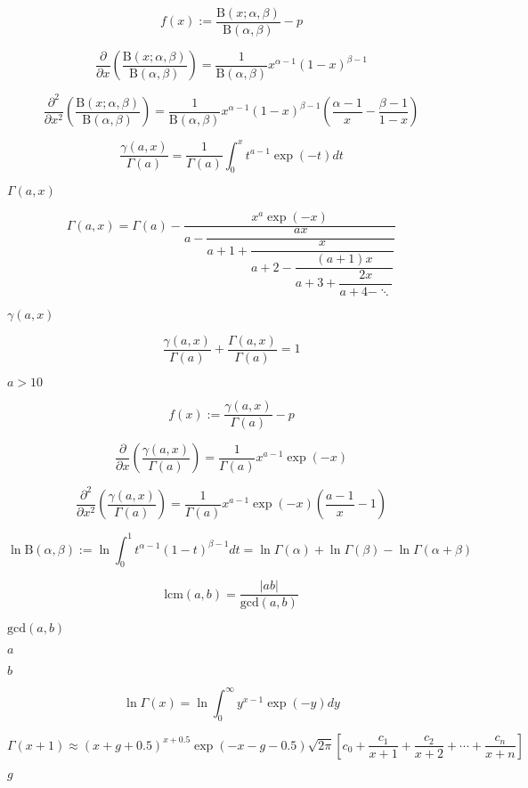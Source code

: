 \documentclass{article}
\begin{document}
\[ f(x) := \frac{\text{B}(x;\alpha,\beta)}{\text{B}(\alpha,\beta)} - p \]
\pagebreak

\[ \frac{\partial}{\partial x} \left(\frac{\text{B}(x;\alpha,\beta)}{\text{B}(\alpha,\beta)}\right) = \frac{1}{\text{B}(\alpha,\beta)} x^{\alpha-1} (1-x)^{\beta-1} \]
\pagebreak

\[ \frac{\partial^2}{\partial x^2} \left(\frac{\text{B}(x;\alpha,\beta)}{\text{B}(\alpha,\beta)}\right) = \frac{1}{\text{B}(\alpha,\beta)} x^{\alpha-1} (1-x)^{\beta-1} \left( \frac{\alpha-1}{x} - \frac{\beta-1}{1 - x} \right) \]
\pagebreak

\[ \frac{\gamma(a,x)}{\Gamma(a)} = \frac{1}{\Gamma(a)} \int_0^x t^{a-1} \exp(-t) dt \]
\pagebreak

$ \Gamma(a,x) $
\pagebreak

\[ \Gamma(a,x) = \Gamma(a) - \dfrac{x^a\exp(-x)}{a - \dfrac{ax}{a + 1 + \dfrac{x}{a + 2 - \dfrac{(a+1)x}{a + 3 + \dfrac{2x}{a + 4 - \ddots}}}}} \]
\pagebreak

$ \gamma(a,x) $
\pagebreak

\[ \frac{\gamma(a,x)}{\Gamma(a)} + \frac{\Gamma(a,x)}{\Gamma(a)} = 1 \]
\pagebreak

$ a > 10 $
\pagebreak

\[ f(x) := \frac{\gamma(a,x)}{\Gamma(a)} - p \]
\pagebreak

\[ \frac{\partial}{\partial x} \left(\frac{\gamma(a,x)}{\Gamma(a)}\right) = \frac{1}{\Gamma(a)} x^{a-1} \exp(-x) \]
\pagebreak

\[ \frac{\partial^2}{\partial x^2} \left(\frac{\gamma(a,x)}{\Gamma(a)}\right) = \frac{1}{\Gamma(a)} x^{a-1} \exp(-x) \left( \frac{a-1}{x} - 1 \right) \]
\pagebreak

\[ \ln \text{B}(\alpha,\beta) := \ln \int_0^1 t^{\alpha - 1} (1-t)^{\beta - 1} dt = \ln \Gamma(\alpha) + \ln \Gamma(\beta) - \ln \Gamma(\alpha + \beta) \]
\pagebreak

\[ \text{lcm}(a,b) = \dfrac{| a b |}{\text{gcd}(a,b)} \]
\pagebreak

$ \text{gcd}(a,b) $
\pagebreak

$ a $
\pagebreak

$ b $
\pagebreak

\[ \ln \Gamma(x) = \ln \int_0^\infty y^{x-1} \exp(-y) dy \]
\pagebreak

\[ \Gamma(x+1) \approx (x+g+0.5)^{x+0.5} \exp(-x-g-0.5) \sqrt{2 \pi} \left[ c_0 + \frac{c_1}{x+1} + \frac{c_2}{x+2} + \cdots + \frac{c_n}{x+n} \right] \]
\pagebreak

$ g $
\pagebreak
\end{document}
